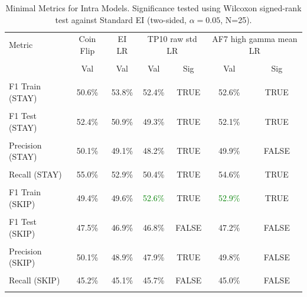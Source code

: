 \begin{table}[H]
\centering
\begin{tabular}{lcccccc}
\hline
Metric & Coin Flip & EI LR & \multicolumn{2}{c}{TP10 raw std LR} & \multicolumn{2}{c}{AF7 high gamma mean LR} \\\\
 & Val & Val & Val & Sig & Val & Sig \\\\
\hline
F1 Train (STAY) & 50.6\% & 53.8\% & 52.4\% & TRUE & 52.6\% & TRUE \\\\
F1 Test (STAY) & 52.4\% & 50.9\% & 49.3\% & TRUE & 52.1\% & TRUE \\\\
Precision (STAY) & 50.1\% & 49.1\% & 48.2\% & TRUE & 49.9\% & FALSE \\\\
Recall (STAY) & 55.0\% & 52.9\% & 50.4\% & TRUE & 54.6\% & TRUE \\\\
F1 Train (SKIP) & 49.4\% & 49.6\% & \textcolor{green}{52.6\%} & TRUE & \textcolor{green}{52.9\%} & TRUE \\\\
F1 Test (SKIP) & 47.5\% & 46.9\% & 46.8\% & FALSE & 47.2\% & FALSE \\\\
Precision (SKIP) & 50.1\% & 48.9\% & 47.9\% & TRUE & 49.8\% & FALSE \\\\
Recall (SKIP) & 45.2\% & 45.1\% & 45.7\% & FALSE & 45.0\% & FALSE \\\\
\hline
\end{tabular}
\caption{Minimal Metrics for Intra Models. Significance tested using Wilcoxon signed-rank test against Standard EI (two-sided, $\alpha=0.05$, N=25).}
\label{tab:metrics_intra_ablation}
\end{table}